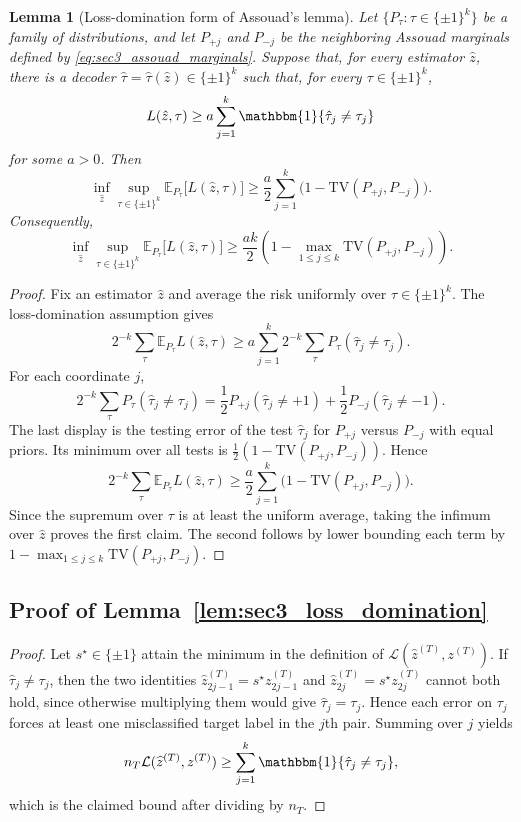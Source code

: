 \documentclass[10pt]{article}
\newtheorem{lemma}{Lemma}
\newcommand{\Ebb}{\mathbb E}
\newcommand{\wh}{\widehat}
\newcommand{\calL}{\mathcal L}
\newcommand{\TV}{\mathrm{TV}}
\newcommand{\trg}{T}
\newcommand{\nT}{n_{\trg}}
\newcommand{\ztar}{z^{(\trg)}}
\newcommand{\hatztar}{\wh{z}^{(\trg)}}
\begin{document}
\begin{lemma}[Loss-domination form of Assouad's lemma]
\label{lem:sec3_loss_domination_assouad}
Let $\{P_\tau:\tau\in\{\pm1\}^k\}$ be a family of distributions, and let
$P_{+j}$ and $P_{-j}$ be the neighboring Assouad marginals defined by
\eqref{eq:sec3_assouad_marginals}. Suppose that, for every estimator
$\hat z$, there is a decoder $\hat\tau=\hat\tau(\hat z)\in\{\pm1\}^k$
such that, for every $\tau\in\{\pm1\}^k$,
\[
    L(\hat z,\tau)
    \ge
    a\sum_{j=1}^k \mathbbm{1}\{\hat\tau_j\neq\tau_j\}
\]
for some $a>0$. Then
\[
    \inf_{\hat z}\sup_{\tau\in\{\pm1\}^k}
    \Ebb_{P_\tau}\bigl[L(\hat z,\tau)\bigr]
    \ge
    \frac{a}{2}\sum_{j=1}^k
    \bigl(1-\TV(P_{+j},P_{-j})\bigr).
\]
Consequently,
\[
    \inf_{\hat z}\sup_{\tau\in\{\pm1\}^k}
    \Ebb_{P_\tau}\bigl[L(\hat z,\tau)\bigr]
    \ge
    \frac{ak}{2}
    \left(1-\max_{1\le j\le k}\TV(P_{+j},P_{-j})\right).
\]
\end{lemma}

\begin{proof}
Fix an estimator $\hat z$ and average the risk uniformly over
$\tau\in\{\pm1\}^k$. The loss-domination assumption gives
\[
    2^{-k}\sum_{\tau}\Ebb_{P_\tau} L(\hat z,\tau)
    \ge
    a\sum_{j=1}^k
    2^{-k}\sum_{\tau}
    P_\tau(\hat\tau_j\neq\tau_j).
\]
For each coordinate $j$,
\[
    2^{-k}\sum_{\tau}
    P_\tau(\hat\tau_j\neq\tau_j)
    =
    \frac12 P_{+j}(\hat\tau_j\neq +1)
    +
    \frac12 P_{-j}(\hat\tau_j\neq -1).
\]
The last display is the testing error of the test $\hat\tau_j$ for
$P_{+j}$ versus $P_{-j}$ with equal priors. Its minimum over all tests is
$\frac12(1-\TV(P_{+j},P_{-j}))$. Hence
\[
    2^{-k}\sum_{\tau}\Ebb_{P_\tau} L(\hat z,\tau)
    \ge
    \frac{a}{2}\sum_{j=1}^k
    \bigl(1-\TV(P_{+j},P_{-j})\bigr).
\]
Since the supremum over $\tau$ is at least the uniform average, taking the
infimum over $\hat z$ proves the first claim. The second follows by lower
bounding each term by
$1-\max_{1\le j\le k}\TV(P_{+j},P_{-j})$.
\end{proof}

\subsection{Proof of Lemma~\ref{lem:sec3_loss_domination}}

\begin{proof}
Let $s^\star\in\{\pm1\}$ attain the minimum in the definition of
$\calL(\hatztar,\ztar)$. If $\hat{\tau}_j\neq\tau_j$, then the two identities
$\hatztar_{2j-1}=s^\star\ztar_{2j-1}$ and $\hatztar_{2j}=s^\star\ztar_{2j}$
cannot both hold, since otherwise multiplying them would give
$\hat{\tau}_j=\tau_j$. Hence each error on $\tau_j$ forces at least one
misclassified target label in the $j$th pair. Summing over $j$ yields
\[
    \nT \calL(\hatztar,\ztar)
    \ge
    \sum_{j=1}^k \mathbbm{1}\{\hat{\tau}_j\neq\tau_j\},
\]
which is the claimed bound after dividing by $\nT$.
\end{proof}
\end{document}
